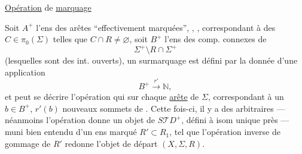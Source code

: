 
 
\uline{Opération} de  \uline{marquage}

Soit $A^+$ l'ens des arêtes  ``effectivement marquées'', ,
,
correspondant à des $C\in\pi_0(\Sigma)$ telles que $C\cap R\ne\varnothing$, soit $B^+$ l'ens des comp. connexes de
\[
 \Sigma^+\setminus R\cap\Sigma^+
\]
(lesquelles sont des int. ouverts), un surmarquage est défini par la donnée d'une application
\[
 B^+\xrightarrow{r'}\mathbb N,
\]
et peut se décrire   l'opération qui sur chaque
\uline{arête} 
de $\Sigma$, correspondant à un $b\in B^+$, $r'(b)$ nouveaux sommets de  .
Cette fois-ci,  il y a des  arbitraires --- néanmoins l'opération donne un objet de $S\mathcal TD^+$, défini à isom unique près  --- muni bien entendu d'un ens marqué $R'\subset R_1$, tel que l'opération inverse de gommage de $R'$ redonne l'objet de départ $(X,\Sigma,R)$.

